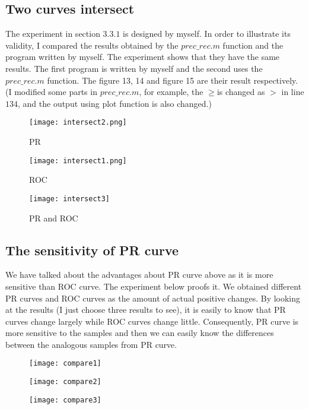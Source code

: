 \documentclass[a4paper,12pt]{article}
\begin{document}
\subsection{Two curves intersect}

The experiment in section $3.3.1$ is designed by myself. In order to illustrate its validity, I compared the results obtained by the $prec\_rec.m$ function and the program written by myself. The experiment shows that they have the same results. The first program is written by myself and the second uses the $prec\_rec.m$ function. The figure 13, 14 and figure 15 are their result respectively. (I modified some parts in $prec\_rec.m$, for example, the $\ge$is changed as $>$ in line $134$, and the output using plot function is also changed.)




\begin{figure}[!ht]
\begin{minipage}[t]{0.5\textwidth}
\texttt{[image: intersect2.png]}
\caption{PR}
\end{minipage}
\begin{minipage}[t]{0.5\textwidth}
\centering\texttt{[image: intersect1.png]}
\caption{ROC}
\end{minipage}
\end{figure}

\begin{figure}[!ht]
\centering\texttt{[image: intersect3]}
\caption{PR and ROC}
\end{figure} 

\subsection{The sensitivity of PR curve}

We have talked about the advantages about PR curve above as it is more sensitive than ROC curve. The experiment below proofs it. We obtained different PR curves and ROC curves as the amount of actual positive changes. By looking at the results (I just choose three results to see), it is easily to know that PR curves change largely while ROC curves change little. Consequently, PR curve is more sensitive to the samples and then we can easily know the differences between the analogous samples from PR curve.   


\begin{figure}[!ht]
\centering\texttt{[image: compare1]}
\end{figure} 
\begin{figure}[!ht]
\centering\texttt{[image: compare2]}
\end{figure} 
\begin{figure}[!ht]
\centering\texttt{[image: compare3]}
\end{figure} 



\end{document}
